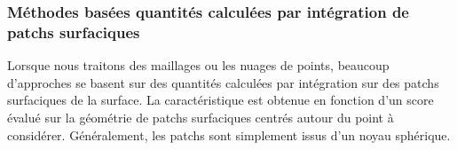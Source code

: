 %
\subsubsection{Méthodes basées quantités calculées par intégration de patchs surfaciques}%
\label{sec:applications:feature:patch}
%
Lorsque nous traitons des maillages ou les nuages de points, beaucoup
d'approches se basent sur des quantités calculées par intégration sur des patchs
surfaciques de la surface. La caractéristique est obtenue en fonction d'un score
évalué sur la géométrie de patchs surfaciques centrés autour du point à
considérer. Généralement, les patchs sont simplement issus d'un noyau sphérique.
%
